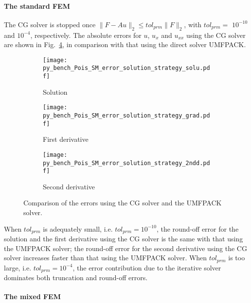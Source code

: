\documentclass[review,3p]{elsarticle}
\begin{document}
\paragraph{The standard FEM}

The CG solver is stopped once $\|F-Au\|_2 \leqslant tol_{prm}\|F\|_2$, with $tol_{prm}=$ $10^{-10}$ and $10^{-4}$, respectively. 
The absolute errors for $u$, $u_{x}$ and $u_{xx}$ using the CG solver are shown in Fig.~\ref{py_bench_Pois_SM_error_solution_strategy}, in comparison with that using the direct solver UMFPACK. 

\begin{figure}[!ht]
    \begin{subfigure}{5.5cm}
        \texttt{[image: py\_bench\_Pois\_SM\_error\_solution\_strategy\_solu.pdf]}
        \caption{Solution}
        \label{py_bench_Pois_SM_error_solution_strategy_solu}
    \end{subfigure}
    \hspace{-0.2cm}
    \begin{subfigure}{5.5cm}
        \texttt{[image: py\_bench\_Pois\_SM\_error\_solution\_strategy\_grad.pdf]}
        \caption{First derivative}
        \label{py_bench_Pois_SM_error_solution_strategy_grad}
    \end{subfigure}
    \hspace{-0.2cm}
    \begin{subfigure}{5.5cm}
        \texttt{[image: py\_bench\_Pois\_SM\_error\_solution\_strategy\_2ndd.pdf]}
        \caption{Second derivative}
        \label{py_bench_Pois_SM_error_solution_strategy_2ndd}
    \end{subfigure}
\caption{Comparison of the errors using the CG solver and the UMFPACK solver.}
\label{py_bench_Pois_SM_error_solution_strategy}
\end{figure}

When $tol_{prm}$ is adequately small, i.e. $tol_{prm}=10^{-10}$, the round-off error for the solution and the first derivative using the CG solver is the same with that using the UMFPACK solver; the round-off error for the second derivative using the CG solver increases faster than that using the UMFPACK solver.
When $tol_{prm}$ is too large, i.e. $tol_{prm}=10^{-4}$, the error contribution due to the iterative solver dominates both truncation and round-off errors. 

\paragraph{The mixed FEM}
\end{document}
